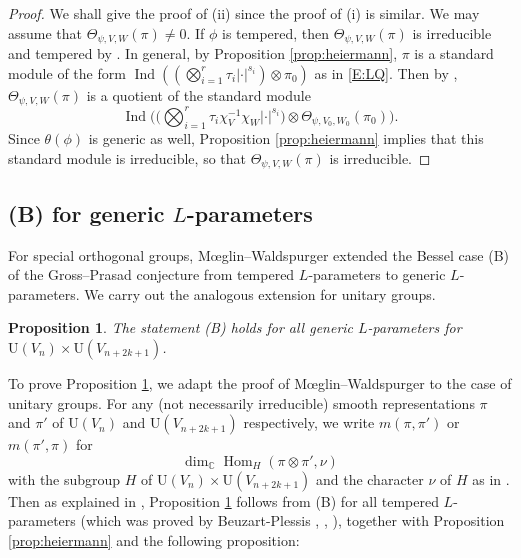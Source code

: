 \documentclass[11pt]{amsart}
\numberwithin{equation}{section}
\theoremstyle{plain}
\newtheorem{prop}[thm]{Proposition}
\theoremstyle{definition}
\theoremstyle{remark}
\def\Hom{\operatorname{Hom}}
\def\Ind{\operatorname{Ind}}
\def\U{\mathrm{U}}
\def\CC{\mathbb{C}}
\begin{document}
\begin{proof}
We shall give the proof of (ii) since the proof of (i) is similar.
We may assume that $\Theta_{\psi,V,W}(\pi) \ne 0$.
If $\phi$ is tempered, then $\Theta_{\psi,V,W}(\pi)$ is irreducible and tempered by \cite[Proposition C.4(i)]{gi}.
In general, by Proposition \ref{prop:heiermann}, $\pi$ is a standard module of the form $\Ind ((\bigotimes_{i=1}^r \tau_i |\cdot|^{s_i}) \otimes \pi_0)$ as in \eqref{E:LQ}.
Then by \cite[Proposition C.4(ii)]{gi}, $\Theta_{\psi,V,W}(\pi)$ is a quotient of the standard module
\[ \Ind \bigl(  \bigl(  \bigotimes_{i=1}^r \tau_i \chi_V^{-1} \chi_W |\cdot|^{s_i} \bigr) \otimes \Theta_{\psi,V_0,W_0}(\pi_0) \bigr). \]
Since $\theta(\phi)$ is generic as well, Proposition \ref{prop:heiermann} implies that this standard module is irreducible, so that $\Theta_{\psi,V,W}(\pi)$ is irreducible.
\end{proof}

\subsection{(B) for generic $L$-parameters}

For special orthogonal groups, M{\oe}glin--Waldspurger \cite{mw} extended the Bessel case (B) of the Gross--Prasad conjecture from tempered $L$-parameters to generic $L$-parameters.
We carry out the analogous extension for unitary groups.

\begin{prop}
\label{P:generic-B}
The statement (B) holds for all generic $L$-parameters for $\U(V_n) \times \U(V_{n+2k+1})$.
\end{prop}

To prove Proposition \ref{P:generic-B}, we adapt the proof of M{\oe}glin--Waldspurger \cite{mw} to the case of unitary groups.
For any (not necessarily irreducible) smooth representations $\pi$ and $\pi'$ of $\U(V_n)$ and $\U(V_{n+2k+1})$ respectively, we write $m(\pi, \pi')$ or $m(\pi', \pi)$ for 
\[
 \dim_\CC \Hom_H(\pi \otimes \pi', \nu)
\]
with the subgroup $H$ of $\U(V_n) \times \U(V_{n+2k+1})$ and the character $\nu$ of $H$ as in \cite[\S 12]{ggp1}.
Then as explained in \cite[\S 3]{mw}, Proposition \ref{P:generic-B} follows from (B) for all tempered $L$-parameters (which was proved by Beuzart-Plessis \cite{bp1}, \cite{bp2}, \cite{bp3}), together with Proposition \ref{prop:heiermann} and the following proposition:
\end{document}
